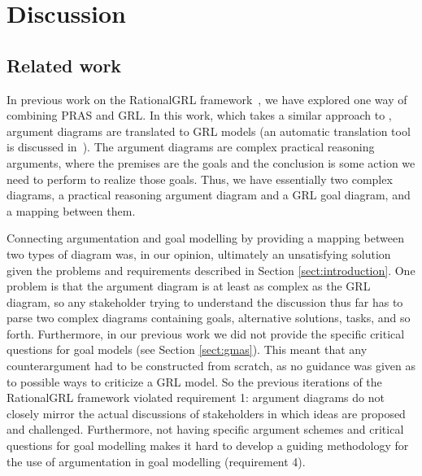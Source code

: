 \section{Discussion}
\label{sect:discussion}

\subsection{Related work}
\label{sect:goalmodeling:relatedwork}

In previous work on the RationalGRL framework~\cite{vanzee-etal:renext2015,vanZee-etal:er2016}, we have explored one way of combining PRAS and GRL. In this work, which takes a similar approach to \cite{Jureta:RE2008}, argument diagrams are translated to GRL models (an automatic translation tool is discussed in~\cite{vanZee-etal:comma2016}). The argument diagrams are complex practical reasoning arguments, where the premises are the goals and the conclusion is some action we need to perform to realize those goals. Thus, we have essentially two complex diagrams, a practical reasoning argument diagram and a GRL goal diagram, and a mapping between them. 

Connecting argumentation and goal modelling by providing a mapping between two types of diagram was, in our opinion, ultimately an unsatisfying solution given the problems and requirements described in Section \ref{sect:introduction}. One problem is that the argument diagram is at least as complex as the GRL diagram, so any stakeholder trying to understand the discussion thus far has to parse two complex diagrams containing goals, alternative solutions, tasks, and so forth. Furthermore, in our previous work we did not provide the specific critical questions for goal models (see Section \ref{sect:gmas}). This meant that any counterargument had to be constructed from scratch, as no guidance was given as to possible ways to criticize a GRL model. So the previous iterations of the RationalGRL framework violated requirement 1: argument diagrams do not closely mirror the actual discussions of stakeholders in which ideas are proposed and challenged. Furthermore, not having specific argument schemes and critical questions for goal modelling makes it hard to develop a guiding methodology for the use of argumentation in goal modelling (requirement 4). 


